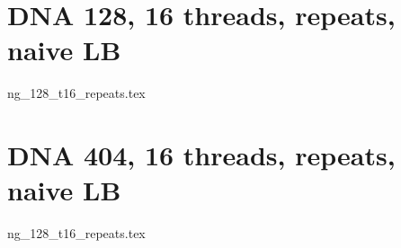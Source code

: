 \documentclass[12pt,a4paper]{article}
\begin{document}
\newcommand*{\figuretitle}[1]{%
    {\centering%
    \textbf{#1}%
    \par\medskip}%
}


\section{DNA 128, 16 threads, repeats, naive LB} 

{ng_128_t16_repeats.tex}

\section{DNA 404, 16 threads, repeats, naive LB} 

{ng_128_t16_repeats.tex}
\end{document}
